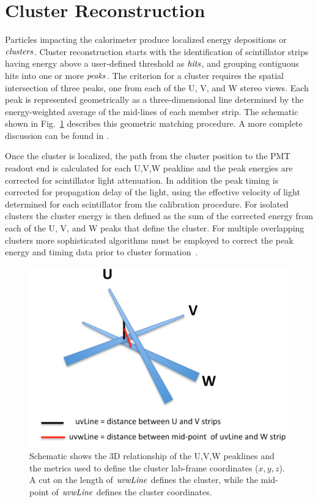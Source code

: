 \section{Cluster Reconstruction}

Particles impacting the calorimeter produce localized energy depositions or ${\it clusters}$.  Cluster reconstruction starts with the identification of scintillator strips having energy above a user-defined threshold as ${\it hits}$, and grouping contiguous hits into one or more ${\it peaks}$.  The criterion for a cluster requires the spatial intersection of three peaks, one from each of the U, V, and W stereo views.  Each peak is represented geometrically as a three-dimensional line determined by the energy-weighted average of the mid-lines of each member strip.  The schematic shown in Fig.~\ref{fig:S6_0} describes this geometric matching procedure.  A more complete discussion can be found in \cite{nim:recon}.

Once the cluster is localized, the path from the cluster position to the PMT readout end is calculated for each
U,V,W peakline and the peak energies are corrected for scintillator light attenuation.  In addition the peak timing is corrected for propagation delay of the light, using the effective velocity of light determined for each scintillator from the calibration procedure.  For isolated clusters the cluster energy is then defined as the sum of the corrected energy from each of the U, V, and W peaks that define the cluster. For multiple overlapping clusters more sophisticated algorithms must be employed to correct the peak energy and timing data prior to cluster formation~\cite{nim:recon}.

\begin{figure}[hbt]
\centering
\includegraphics[width=0.95\columnwidth,keepaspectratio]{img/S6_0.png}
\caption{Schematic shows the 3D relationship of the U,V,W peaklines and the metrics used to define the cluster
  lab-frame coordinates ($x,y,z$). A cut on the length of ${\it uvwLine}$ defines the cluster, while the mid-point of ${\it uvwLine}$ defines the cluster coordinates.}
\label{fig:S6_0}
\end{figure}

